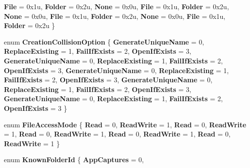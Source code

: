 \begin{DoxyCompactItemize}
{\bfseries File} = 0x1u, 
{\bfseries Folder} = 0x2u, 
{\bfseries None} = 0x0u, 
{\bfseries File} = 0x1u, 
\newline
{\bfseries Folder} = 0x2u, 
{\bfseries None} = 0x0u, 
{\bfseries File} = 0x1u, 
{\bfseries Folder} = 0x2u, 
\newline
{\bfseries None} = 0x0u, 
{\bfseries File} = 0x1u, 
{\bfseries Folder} = 0x2u
 \}
\item 
\mbox{\label{namespace_windows_1_1_storage_a47f58c5ed62127e58f4cd3b2e14d0bfb}} 
enum {\bfseries Creation\+Collision\+Option} \{ \newline
{\bfseries Generate\+Unique\+Name} = 0, 
{\bfseries Replace\+Existing} = 1, 
{\bfseries Fail\+If\+Exists} = 2, 
{\bfseries Open\+If\+Exists} = 3, 
\newline
{\bfseries Generate\+Unique\+Name} = 0, 
{\bfseries Replace\+Existing} = 1, 
{\bfseries Fail\+If\+Exists} = 2, 
{\bfseries Open\+If\+Exists} = 3, 
\newline
{\bfseries Generate\+Unique\+Name} = 0, 
{\bfseries Replace\+Existing} = 1, 
{\bfseries Fail\+If\+Exists} = 2, 
{\bfseries Open\+If\+Exists} = 3, 
\newline
{\bfseries Generate\+Unique\+Name} = 0, 
{\bfseries Replace\+Existing} = 1, 
{\bfseries Fail\+If\+Exists} = 2, 
{\bfseries Open\+If\+Exists} = 3, 
\newline
{\bfseries Generate\+Unique\+Name} = 0, 
{\bfseries Replace\+Existing} = 1, 
{\bfseries Fail\+If\+Exists} = 2, 
{\bfseries Open\+If\+Exists} = 3
 \}
\item 
\mbox{\label{namespace_windows_1_1_storage_a5692c3d5d5dc5255f90f05e0a6c3ae9e}} 
enum {\bfseries File\+Access\+Mode} \{ \newline
{\bfseries Read} = 0, 
{\bfseries Read\+Write} = 1, 
{\bfseries Read} = 0, 
{\bfseries Read\+Write} = 1, 
\newline
{\bfseries Read} = 0, 
{\bfseries Read\+Write} = 1, 
{\bfseries Read} = 0, 
{\bfseries Read\+Write} = 1, 
\newline
{\bfseries Read} = 0, 
{\bfseries Read\+Write} = 1
 \}
\item 
\mbox{\label{namespace_windows_1_1_storage_ad806137f79e39155cbf64fd8e1e6de11}} 
enum {\bfseries Known\+Folder\+Id} \{ \newline
{\bfseries App\+Captures} = 0, 

\end{DoxyCompactItemize}

